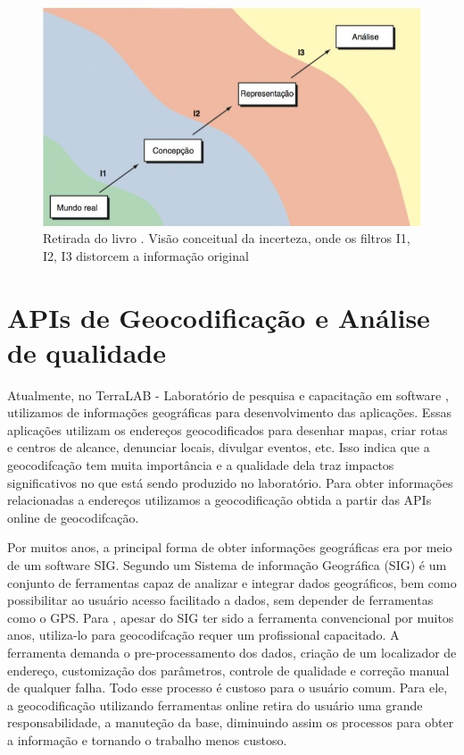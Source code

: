 \begin{figure}[ht]
   \centering
   \includegraphics[width=\textwidth]{Figuras/incertezaLivro.jpeg}
   \caption{Retirada do livro \cite{longley2013}. Visão conceitual da incerteza, onde os filtros I1, I2, I3 distorcem a informação original}
   \label{fig:incerteza}
\end{figure}

\section{APIs de Geocodificação e Análise de qualidade}
Atualmente, no TerraLAB - Laboratório de pesquisa e capacitação em software \cite{terralab}, utilizamos de informações geográficas para desenvolvimento das aplicações. Essas aplicações utilizam os endereços geocodificados para desenhar mapas, criar rotas e centros de alcance, denunciar locais, divulgar eventos, etc. Isso indica que a geocodifcação tem muita importância e a qualidade dela traz impactos significativos no que está sendo produzido no laboratório. 
Para obter informações relacionadas a endereços utilizamos a geocodificação obtida a partir das APIs online de geocodifcação. 

Por muitos anos, a principal forma de obter informações geográficas era por meio de um software SIG. Segundo \cite{stein2021geoprocessamento} um Sistema de informação Geográfica (SIG) é um conjunto de ferramentas capaz de analizar e integrar dados geográficos, bem como possibilitar ao usuário acesso facilitado a dados, sem depender de ferramentas como o GPS.
Para \cite{Chow2016}, apesar do SIG ter sido a ferramenta convencional por muitos anos, utiliza-lo para geocodifcação requer um profissional capacitado. A ferramenta demanda o pre-processamento dos dados, criação de um localizador de endereço, customização dos parâmetros, controle de qualidade e correção manual de qualquer falha. Todo esse processo é custoso para o usuário comum. Para ele, a geocodificação utilizando ferramentas online retira do usuário uma grande responsabilidade, a manuteção da base, diminuindo assim os processos para obter a informação e tornando o trabalho menos custoso. 

